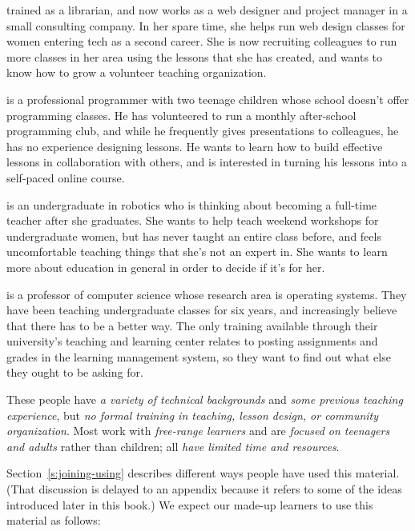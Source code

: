 \begin{description}
\tightlist
\item[Emily]
trained as a librarian, and now works as a web designer and project
manager in a small consulting company. In her spare time, she helps
run web design classes for women entering tech as a second career.
She is now recruiting colleagues to run more classes in her area
using the lessons that she has created, and wants to know how to
grow a volunteer teaching organization.
\item[Moshe]
is a professional programmer with two teenage children whose school
doesn't offer programming classes. He has volunteered to run a
monthly after-school programming club, and while he frequently gives
presentations to colleagues, he has no experience designing lessons.
He wants to learn how to build effective lessons in collaboration
with others, and is interested in turning his lessons into a
self-paced online course.
\item[Samira]
is an undergraduate in robotics who is thinking about becoming a
full-time teacher after she graduates. She wants to help teach
weekend workshops for undergraduate women, but has never taught an
entire class before, and feels uncomfortable teaching things that
she's not an expert in. She wants to learn more about education in
general in order to decide if it's for her.
\item[Gene]
is a professor of computer science whose research area is operating
systems. They have been teaching undergraduate classes for six
years, and increasingly believe that there has to be a better way.
The only training available through their university's teaching and
learning center relates to posting assignments and grades in the
learning management system, so they want to find out what else they
ought to be asking for.
\end{description}

These people have \emph{a variety of technical backgrounds} and \emph{some
previous teaching experience}, but \emph{no formal training in teaching,
lesson design, or community organization}. Most work with \emph{free-range
learners} and are \emph{focused on teenagers and adults} rather than
children; all \emph{have limited time and resources}.

Section~\ref{s:joining-using} describes different ways people have used
this material. (That discussion is delayed to an appendix because it
refers to some of the ideas introduced later in this book.) We expect
our made-up learners to use this material as follows:

